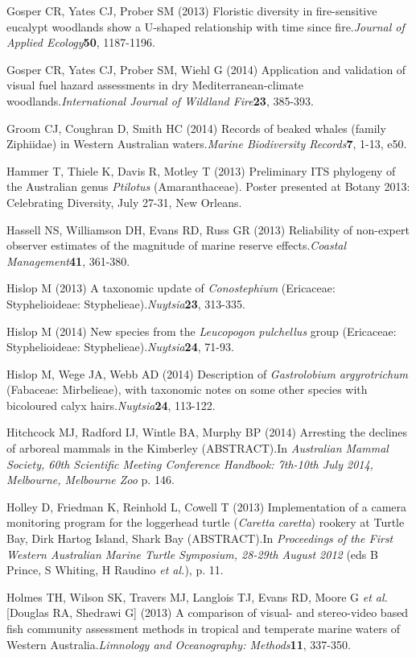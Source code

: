 \documentclass[version=last, paper=a4, DIV=18, usenames, dvipsnames]{scrartcl}
\begin{document}
Gosper CR, Yates CJ, Prober SM (2013) Floristic diversity in fire-sensitive eucalypt woodlands show a U-shaped relationship with time since fire.\emph{Journal of Applied Ecology}\textbf{50}, 1187-1196.


Gosper CR, Yates CJ, Prober SM, Wiehl G (2014) Application and validation of visual fuel hazard assessments in dry Mediterranean-climate woodlands.\emph{International Journal of Wildland Fire}\textbf{23}, 385-393.


Groom CJ, Coughran D, Smith HC (2014) Records of beaked whales (family Ziphiidae) in Western Australian waters.\emph{Marine Biodiversity Records}\textbf{7}, 1-13, e50.


Hammer T, Thiele K, Davis R, Motley T (2013) Preliminary ITS phylogeny of the Australian genus \emph{Ptilotus} (Amaranthaceae). Poster presented at Botany 2013: Celebrating Diversity, July 27-31, New Orleans.


Hassell NS, Williamson DH, Evans RD, Russ GR (2013) Reliability of non-expert observer estimates of the magnitude of marine reserve effects.\emph{Coastal Management}\textbf{41}, 361-380.


Hislop M (2013) A taxonomic update of \emph{Conostephium} (Ericaceae: Styphelioideae: Styphelieae).\emph{Nuytsia}\textbf{23}, 313-335.


Hislop M (2014) New species from the \emph{Leucopogon} \emph{pulchellus} group (Ericaceae: Styphelioideae: Styphelieae).\emph{Nuytsia}\textbf{24}, 71-93.


Hislop M, Wege JA, Webb AD (2014) Description of \emph{Gastrolobium} \emph{argyrotrichum} (Fabaceae: Mirbelieae), with taxonomic notes on some other species with bicoloured calyx hairs.\emph{Nuytsia}\textbf{24}, 113-122.


Hitchcock MJ, Radford IJ, Wintle BA, Murphy BP (2014) Arresting the declines of arboreal mammals in the Kimberley (ABSTRACT).In \emph{Australian Mammal Society, 60th Scientific Meeting Conference Handbook: 7th-10th July 2014, Melbourne, Melbourne Zoo} p. 146.


Holley D, Friedman K, Reinhold L, Cowell T (2013) Implementation of a camera monitoring program for the loggerhead turtle (\emph{Caretta} \emph{caretta}) rookery at Turtle Bay, Dirk Hartog Island, Shark Bay (ABSTRACT).In \emph{Proceedings of the First Western Australian Marine Turtle Symposium, 28-29th August 2012} (eds B Prince, S Whiting, H Raudino \emph{et al.}), p. 11.


Holmes TH, Wilson SK, Travers MJ, Langlois TJ, Evans RD, Moore G \emph{et al.} [Douglas RA, Shedrawi G] (2013) A comparison of visual- and stereo-video based fish community assessment methods in tropical and temperate marine waters of Western Australia.\emph{Limnology and Oceanography: Methods}\textbf{11}, 337-350.
\end{document}
